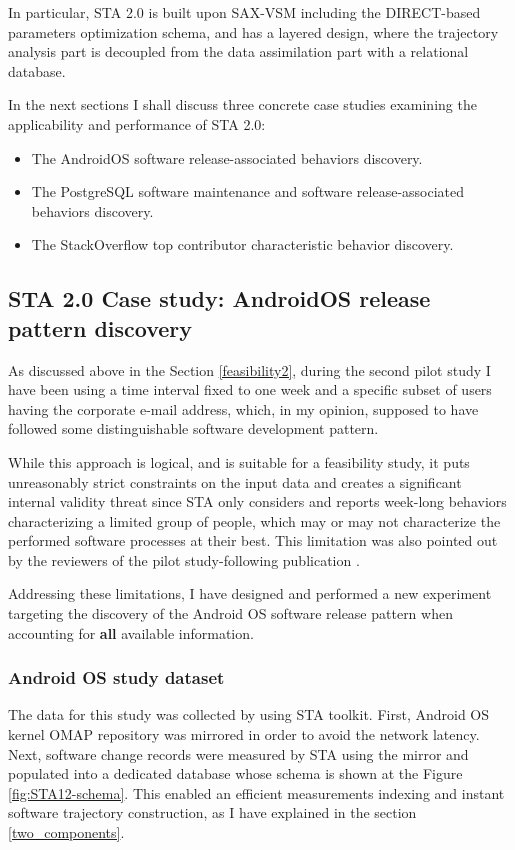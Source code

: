 In particular, STA 2.0 is built upon SAX-VSM including the DIRECT-based parameters optimization schema, and has a layered design, where the trajectory analysis part is decoupled from the data assimilation part with a relational database.

In the next sections I shall discuss three concrete case studies examining the applicability and performance of STA 2.0:
\begin{itemize}
 \item The AndroidOS software release-associated behaviors discovery.
 \item The PostgreSQL software maintenance and software release-associated behaviors discovery.
 \item The StackOverflow top contributor characteristic behavior discovery.
\end{itemize}

\subsection{STA 2.0 Case study: AndroidOS release pattern discovery}\label{case1}
As discussed above in the Section \ref{feasibility2}, during the second pilot study I have been using a time interval fixed to one week and a specific subset of users having the corporate e-mail address, which, in my opinion, supposed to have followed some distinguishable software development pattern. 

While this approach is logical, and is suitable for a feasibility study, it puts unreasonably strict constraints on the input data and creates a significant internal validity threat since STA only considers and reports week-long behaviors characterizing a limited group of people, which may or may not characterize the performed software processes at their best. This limitation was also pointed out by the reviewers of the pilot study-following publication \cite{csdl2-11-10}.

Addressing these limitations, I have designed and performed a new experiment targeting the discovery of the Android OS software release pattern when accounting for \textbf{all} available information.

\subsubsection{Android OS study dataset}
The data for this study was collected by using STA toolkit. First, Android OS kernel OMAP repository was mirrored in order to avoid the network latency. Next, software change records were measured by STA using the mirror and populated into a dedicated database whose schema is shown at the Figure \ref{fig:STA12-schema}. This enabled an efficient measurements indexing and instant software trajectory construction, as I have explained in the section \ref{two_components}.

